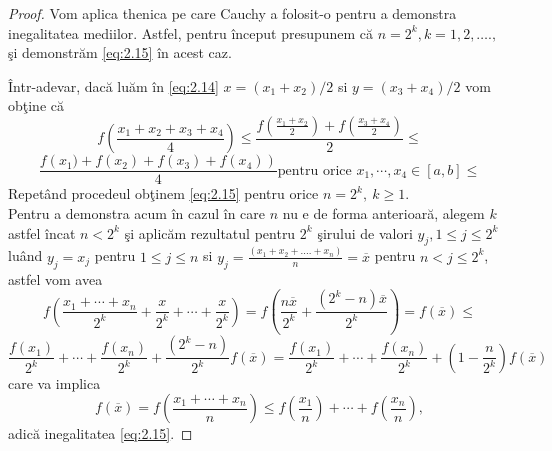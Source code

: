 \documentclass[a4paper,12pt,oneside]{report}
\begin{document}
\begin{proof}
Vom aplica thenica pe care Cauchy a folosit-o pentru a demonstra inegalitatea mediilor. Astfel, pentru \^{i}nceput presupunem c\u{a} \(n = 2^{k}, k=1,2,….,\) \c{s}i demonstr\u{a}m \ref{eq:2.15} \^{i}n acest caz.

\^{I}ntr-adevar, dac\u{a} lu\u{a}m \^{i}n \ref{eq:2.14} $x=(x_1+x_2)/2$ si $y=(x_3+x_4)/2$ vom ob\c{t}ine c\u{a}
\begin{equation*}
  f\left ( \frac{x_1 + x_2+x_3+x_4}{4} \right ) \leq \frac{f\left ( \frac{x_1 + x_2}{2} \right) + f\left(\frac{x_3 + x_4}{2} \right )}{2} \leq
\end{equation*}
\begin{equation*}
   \frac{f\left (x_1) + f\left (x_2 \right )+f\left (x_3 \right )+f\left (x_4 \right ) \right)}{4} \text{pentru orice } x_1, \cdots, x_4 \in \left [ a, b \right ]\leq
\end{equation*}
Repet\^{a}nd procedeul ob\c{t}inem \ref{eq:2.15} pentru orice $n=2^k,~k\geq 1.$\\
 Pentru a demonstra acum \^{i}n cazul \^{i}n care $n$ nu e de forma anterioar\u{a}, alegem  \(k\) astfel \^{i}ncat \(n< 2^{k}\) \c{s}i aplic\u{a}m rezultatul pentru \(2^{k}\) \c{s}irului de valori \(y_{j} , 1\leq j\leq 2^{k}\) lu\^{a}nd \(y_{j} = x_{j}\) pentru \(1\leq j\leq n \) si \(y_{j} = \frac{\left ( x_{1} + x_{2} + ....+ x_{n} \right )}{n}=\overline{x}\) pentru \(n< j\leq 2^{k}\), astfel vom avea
 \[
   f\left ( \frac{x_1 + \cdots+x_n}{2^k}+\frac{x}{2^k}+\cdots+\frac{x}{2^k} \right )=f\left( \frac{n \overline{x}}{2^k}+\frac{(2^k-n) \overline{x}}{2^k}\right)=f(\overline{x}) \leq
 \]
 \[
\frac{ f(x_1)}{2^k}+\cdots+\frac{ f(x_n)}{2^k}+\frac{(2^k-n)}{2^k}f(\overline{x})=\frac{ f(x_1)}{2^k}+\cdots+\frac{ f(x_n)}{2^k}+ (1-\frac{n}{2^k})f(\overline{x})
 \]
 care va implica
 \[
 f(\overline{x})=  f\left ( \frac{x_1 + \cdots+x_n}{n} \right )\leq f\left ( \frac{x_1}{n} \right )+\cdots+f\left ( \frac{x_n}{n} \right ),
 \]
 adic\u{a} inegalitatea \ref{eq:2.15}.
\end{proof}
\end{document}
